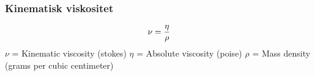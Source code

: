 \documentclass[aspectratio=169,xcolor=dvipsnames]{beamer}
\begin{document}
%
%
\begin{frame}
	\frametitle{Kinematisk viskositet}

	


%
%
$$\nu = {\eta \over \rho}$$
%
%
$\nu$ = Kinematic viscosity (stokes)
%
$\eta$ = Absolute viscosity (poise)
%
$\rho$ = Mass density (grams per cubic centimeter)
%
%
\end{frame}
%
%
%
%
%
%
%
%
%
%
\end{document}
